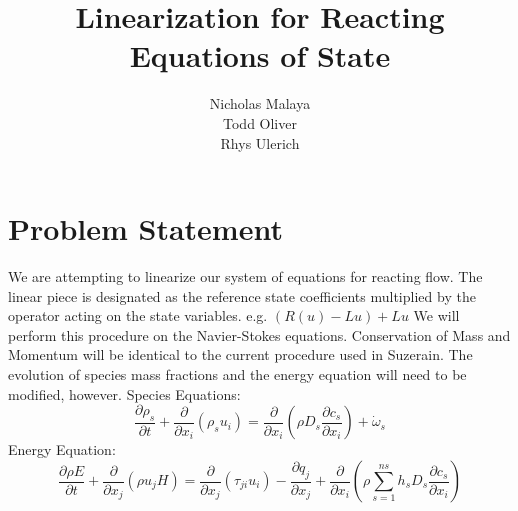 \documentclass[10pt]{article}
\title{Linearization for Reacting Equations of State}
\author{Nicholas Malaya \\
        Todd Oliver \\ 
	Rhys Ulerich \\ }
\begin{document}
\maketitle

\section{Problem Statement}

We are attempting to linearize our system of equations for reacting
flow. The linear piece is designated as the reference state coefficients
multiplied by the operator acting on the state variables. 
\newline
\newline
e.g. $(R(u)-Lu) + Lu$
\newline
\newline
We will perform this procedure on the Navier-Stokes
equations. Conservation of Mass and Momentum will be identical to the
current procedure used in Suzerain. The evolution of species mass
fractions and the energy equation will need to be modified, however. 
\newline
\newline
Species Equations:
\begin{equation}
 \frac{\partial \rho_s}{\partial t} + \frac{\partial}{\partial
  x_i}(\rho_s u_i) = \frac{\partial}{\partial x_i}(\rho D_s
  \frac{\partial c_s}{\partial x_i}) + \dot \omega_s
\end{equation}
\newline
\newline
Energy Equation:
\begin{equation}
\frac{\partial \rho E}{\partial t} + \frac{\partial }{\partial x_j}(\rho
u_j H) = \frac{\partial }{\partial x_j}(\tau_{ji}u_i) - \frac{\partial
q_j}{\partial x_j} + \frac{\partial }{\partial x_i}(\rho \sum^{ns}_{s=1}
h_s D_s \frac{\partial c_s}{\partial x_i})
\end{equation}
\end{document}
